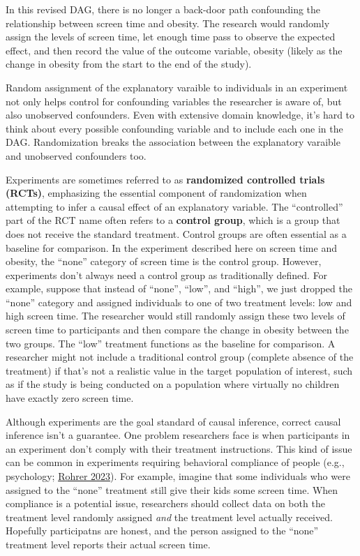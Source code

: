 \documentclass[
]{book}
\begin{document}
In this revised DAG, there is no longer a back-door path confounding the relationship between screen time and obesity. The research would randomly assign the levels of screen time, let enough time pass to observe the expected effect, and then record the value of the outcome variable, obesity (likely as the change in obesity from the start to the end of the study).

Random assignment of the explanatory varaible to individuals in an experiment not only helps control for confounding variables the researcher is aware of, but also unobserved confounders. Even with extensive domain knowledge, it's hard to think about every possible confounding variable and to include each one in the DAG. Randomization breaks the association between the explanatory varaible and unobserved confounders too.

Experiments are sometimes referred to as \textbf{randomized controlled trials (RCTs)}, emphasizing the essential component of randomization when attempting to infer a causal effect of an explanatory variable. The ``controlled'' part of the RCT name often refers to a \textbf{control group}, which is a group that does not receive the standard treatment. Control groups are often essential as a baseline for comparison. In the experiment described here on screen time and obesity, the ``none'' category of screen time is the control group. However, experiments don't always need a control group as traditionally defined. For example, suppose that instead of ``none'', ``low'', and ``high'', we just dropped the ``none'' category and assigned individuals to one of two treatment levels: low and high screen time. The researcher would still randomly assign these two levels of screen time to participants and then compare the change in obesity between the two groups. The ``low'' treatment functions as the baseline for comparison. A researcher might not include a traditional control group (complete absence of the treatment) if that's not a realistic value in the target population of interest, such as if the study is being conducted on a population where virtually no children have exactly zero screen time.

Although experiments are the goal standard of causal inference, correct causal inference isn't a guarantee. One problem researchers face is when participants in an experiment don't comply with their treatment instructions. This kind of issue can be common in experiments requiring behavioral compliance of people (e.g., psychology; \href{https://compass.onlinelibrary.wiley.com/doi/epdf/10.1111/spc3.12948}{Rohrer 2023}). For example, imagine that some individuals who were assigned to the ``none'' treatment still give their kids some screen time. When compliance is a potential issue, researchers should collect data on both the treatment level randomly assigned \emph{and} the treatment level actually received. Hopefully participatns are honest, and the person assigned to the ``none'' treatment level reports their actual screen time.
\end{document}
